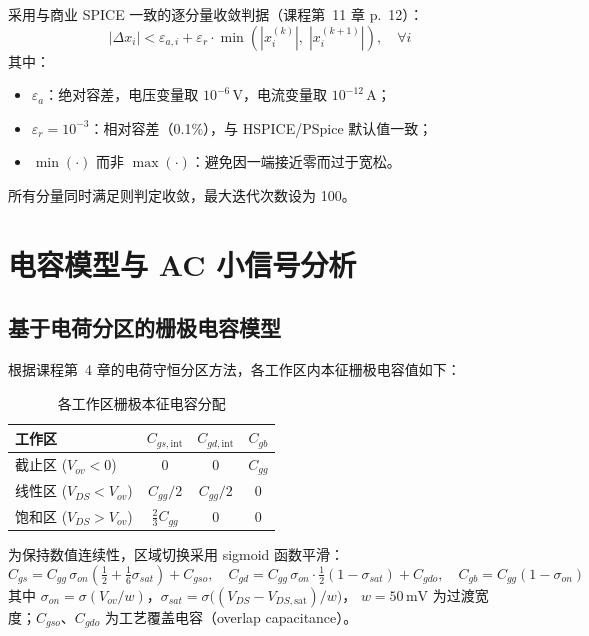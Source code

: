 \documentclass[12pt, a4paper]{article}
\begin{document}
采用与商业 SPICE 一致的逐分量收敛判据（课程第~11 章 p.~12）：
\[
  |\Delta x_i| < \varepsilon_{a,i} + \varepsilon_r \cdot
  \min\!\left(|x_i^{(k)}|,\; |x_i^{(k+1)}|\right), \quad \forall i
\]
其中：
\begin{itemize}
  \item $\varepsilon_{a}$：绝对容差，电压变量取 $10^{-6}\,\mathrm{V}$，电流变量取 $10^{-12}\,\mathrm{A}$；
  \item $\varepsilon_r = 10^{-3}$：相对容差（0.1\%），与 HSPICE/PSpice 默认值一致；
  \item $\min(\cdot)$ 而非 $\max(\cdot)$：避免因一端接近零而过于宽松。
\end{itemize}
所有分量同时满足则判定收敛，最大迭代次数设为 100。

\section{电容模型与 AC 小信号分析}

\subsection{基于电荷分区的栅极电容模型}

根据课程第~4 章的电荷守恒分区方法，各工作区内本征栅极电容值如下：

\begin{table}[H]
\centering
\caption{各工作区栅极本征电容分配}
\label{tab:caps}
\begin{tabular}{lccc}
\toprule
工作区 & $C_{gs,\mathrm{int}}$ & $C_{gd,\mathrm{int}}$ & $C_{gb}$ \\
\midrule
截止区 ($V_{ov}<0$) & $0$ & $0$ & $C_{gg}$ \\
线性区 ($V_{DS}<V_{ov}$) & $C_{gg}/2$ & $C_{gg}/2$ & $0$ \\
饱和区 ($V_{DS}>V_{ov}$) & $\tfrac{2}{3}C_{gg}$ & $0$ & $0$ \\
\bottomrule
\end{tabular}
\end{table}

为保持数值连续性，区域切换采用 sigmoid 函数平滑：
\[
  C_{gs} = C_{gg}\,\sigma_{on}\!\left(\tfrac{1}{2}+\tfrac{1}{6}\sigma_{sat}\right) + C_{gso},\quad
  C_{gd} = C_{gg}\,\sigma_{on}\cdot\tfrac{1}{2}(1-\sigma_{sat}) + C_{gdo},\quad
  C_{gb} = C_{gg}(1-\sigma_{on})
\]
其中 $\sigma_{on}=\sigma(V_{ov}/w)$，$\sigma_{sat}=\sigma\bigl((V_{DS}-V_{DS,\mathrm{sat}})/w\bigr)$，
$w=50\,\mathrm{mV}$ 为过渡宽度；$C_{gso}$、$C_{gdo}$ 为工艺覆盖电容（overlap capacitance）。
\end{document}
